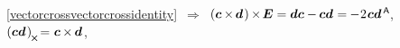 \vspace{-0.8em}\noindent
{}

\nopagebreak
{\centering \eqref{vectorcrossvectorcrossidentity}~$\Rightarrow$~${\left( \bm{c} \hspace{-0.1ex} \times \hspace{-0.2ex} \bm{d} \hspace{.2ex} \right) \hspace{-0.12ex} \times \hspace{-0.25ex} \bm{E} = \bm{d} \bm{c} - \hspace{-0.1ex} \bm{c} \bm{d} \hspace{.1ex} = \hspace{-0.1ex} - \hspace{.1ex} 2 \hspace{.15ex} \bm{c}\bm{d}^{\mathsf{\hspace{.3ex}A}}\hspace{-0.2ex}}$,\hspace{.32em}
${\left( \bm{c} \bm{d} \hspace{.2ex} \right)_{\hspace{-0.15ex}\Xcompanion} \hspace{-0.32ex} =
\hspace{.1ex} \bm{c} \hspace{-0.1ex} \times \hspace{-0.15ex} \bm{d} \hspace{.12ex}}$, \par}

\nopagebreak\vspace{-0.1em}\noindent
{}

